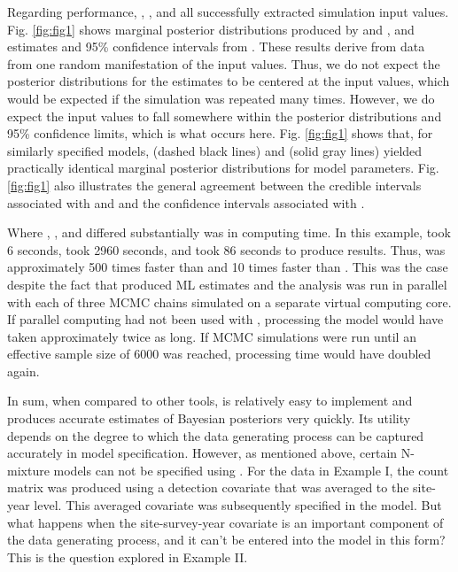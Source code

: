\documentclass[codesnippet]{jss}
\begin{document}
Regarding performance, , , and  all successfully extracted simulation input values. Fig. \ref{fig:fig1} shows marginal posterior distributions produced by  and , and estimates and 95\% confidence intervals from . These results derive from data from one random manifestation of the input values. Thus, we do not expect the posterior distributions for the estimates to be centered at the input values, which would be expected if the simulation was repeated many times. However, we do expect the input values to fall somewhere within the posterior distributions and 95\% confidence limits, which is what occurs here. Fig. \ref{fig:fig1} shows that, for similarly specified models,  (dashed black lines) and  (solid gray lines) yielded practically identical marginal posterior distributions for model parameters. Fig. \ref{fig:fig1} also illustrates the general agreement between the credible intervals associated with  and  and the confidence intervals associated with .

Where , , and  differed substantially was in computing time. In this example,  took 6 seconds,  took 2960 seconds, and  took 86 seconds to produce results. Thus,  was approximately 500 times faster than  and 10 times faster than . This was the case despite the fact that  produced ML estimates and the  analysis was run in parallel with each of three MCMC chains simulated on a separate virtual computing core. If parallel computing had not been used with , processing the  model would have taken approximately twice as long. If MCMC simulations were run until an effective sample size of 6000 was reached, processing time would have doubled again.

In sum, when compared to other tools,  is relatively easy to implement and produces accurate estimates of Bayesian posteriors very quickly. Its utility depends on the degree to which the data generating process can be captured accurately in model specification. However, as mentioned above, certain N-mixture models can not be specified using . For the data in Example I, the count matrix was produced using a detection covariate that was averaged to the site-year level. This averaged covariate was subsequently specified in the model. But what happens when the site-survey-year covariate is an important component of the data generating process, and it can't be entered into the model in this form? This is the question explored in Example II.
\end{document}
